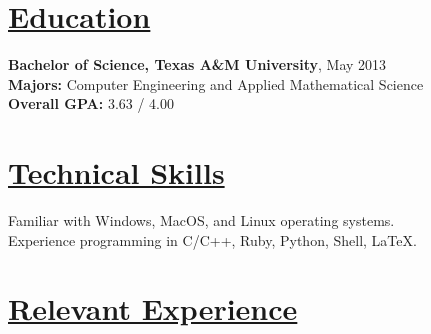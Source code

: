 \documentclass[8pt]{res}
\begin{document}
 

  \address{\bf \underline{Current Address}\\216 Southpoint Crossing Dr.\\Durham, NC 27713}
  \address{\bf \underline{Contact Info}\\juanlb1988@gmail.com\\(254)-449-6995}

  \begin{resume}


    \section{\underline{Education}}          
    \textbf{Bachelor of Science, Texas A\&M University}, May 2013   \\       
    \textbf{Majors:} Computer Engineering and Applied Mathematical Science \\
    \textbf{Overall GPA:} 3.63 / 4.00     


    \section{\underline{Technical Skills}}        
    Familiar with Windows, MacOS, and Linux operating systems. \\
    Experience programming in C/C++, Ruby, Python, Shell, \LaTeX.


    \section{\underline{Relevant Experience}}
    \vspace{-0.08in}	


\end{resume}
\end{document}
